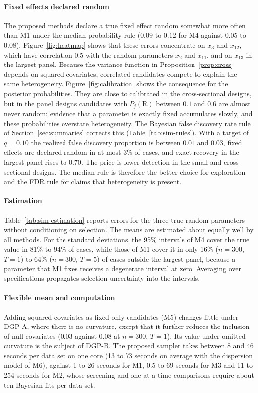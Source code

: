 \paragraph{Fixed effects declared random} The proposed methods declare a true fixed effect random somewhat more often than M1 under the median probability rule ($0.09$ to $0.12$ for M4 against $0.05$ to $0.08$). Figure~\ref{fig:heatmap} shows that these errors concentrate on $x_3$ and $x_{12}$, which have correlation $0.5$ with the random parameters $x_2$ and $x_{11}$, and on $x_{13}$ in the largest panel. Because the variance function in Proposition~\ref{prop:cross} depends on squared covariates, correlated candidates compete to explain the same heterogeneity. Figure~\ref{fig:calibration} shows the consequence for the posterior probabilities. They are close to calibrated in the cross-sectional designs, but in the panel designs candidates with $P_j(\mathrm{R})$ between $0.1$ and $0.6$ are almost never random: evidence that a parameter is exactly fixed accumulates slowly, and these probabilities overstate heterogeneity. The Bayesian false discovery rate rule of Section~\ref{sec:summaries} corrects this (Table~\ref{tab:sim-rules}). With a target of $q=0.10$ the realized false discovery proportion is between $0.01$ and $0.03$, fixed effects are declared random in at most 3\% of cases, and exact recovery in the largest panel rises to $0.70$. The price is lower detection in the small and cross-sectional designs. The median rule is therefore the better choice for exploration and the FDR rule for claims that heterogeneity is present.

\paragraph{Estimation} Table~\ref{tab:sim-estimation} reports errors for the three true random parameters without conditioning on selection. The means are estimated about equally well by all methods. For the standard deviations, the 95\% intervals of M4 cover the true value in 81\% to 94\% of cases, while those of M1 cover it in only 16\% ($n=300$, $T=1$) to 64\% ($n=300$, $T=5$) of cases outside the largest panel, because a parameter that M1 fixes receives a degenerate interval at zero. Averaging over specifications propagates selection uncertainty into the intervals.

\paragraph{Flexible mean and computation} Adding squared covariates as fixed-only candidates (M5) changes little under DGP-A, where there is no curvature, except that it further reduces the inclusion of null covariates ($0.03$ against $0.08$ at $n=300$, $T=1$). Its value under omitted curvature is the subject of DGP-B. The proposed sampler takes between 8 and 46 seconds per data set on one core (13 to 73 seconds on average with the dispersion model of M6), against 1 to 26 seconds for M1, 0.5 to 69 seconds for M3 and 11 to 254 seconds for M2, whose screening and one-at-a-time comparisons require about ten Bayesian fits per data set.

